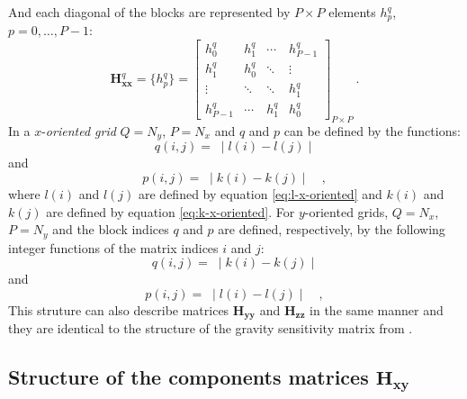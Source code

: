 And each diagonal of the blocks are represented by $P \times P$ elements $h^{q}_{p}$, $p = 0, \dots, P - 1$:
\begin{equation}
\mathbf{H}^{q}_\mathbf{xx} = \{h^{q}_p\} = \begin{bmatrix}
h^{q}_{0}   & h^{q}_{1} & \cdots    & h^{q}_{P-1} \\
h^{q}_{1}   & h^{q}_{0} & \ddots    & \vdots           \\ 
\vdots      & \ddots    & \ddots    & h^{q}_{1}   \\
h^{q}_{P-1} & \cdots    & h^{q}_{1} & h^{q}_{0}                 
\end{bmatrix}_{P \times P} \: .
\label{eq:Hxx_block}
\end{equation}
In a $x$-\textit{oriented grid} $Q = N_{y}$, $P = N_{x}$ and $q$ and $p$ can be defined by the functions:
\begin{equation}
q(i, j) = \; \mid l(i) - l(j) \mid
\label{eq:Hxx-q-x-oriented}
\end{equation}
and
\begin{equation}
p(i, j) = \; \mid k(i) - k(j) \mid \quad ,
\label{eq:Hxx-p-x-oriented}
\end{equation}
where $l(i)$ and $l(j)$ are defined by equation \ref{eq:l-x-oriented} 
and $k(i)$ and $k(j)$ are defined by equation \ref{eq:k-x-oriented}.
For $y$-oriented grids, $Q = N_{x}$, $P = N_{y}$ and the block indices
$q$ and $p$ are defined, respectively, by the following integer functions 
of the matrix indices $i$ and $j$:
\begin{equation}
q(i, j) = \; \mid k(i) - k(j) \mid 
\label{eq:Hxx-q-y-oriented}
\end{equation}
and
\begin{equation}
p(i, j) = \; \mid l(i) - l(j) \mid \quad ,
\label{eq:Hxx-p-y-oriented}
\end{equation}
This struture can also describe matrices $\mathbf{H_{yy}}$ and $\mathbf{H_{zz}}$ in the same manner and they are identical to the structure of the gravity sensitivity matrix from \cite{takahashi2020convolutional}.

\subsection{Structure of the components matrices $\mathbf{H_{xy}}$}


